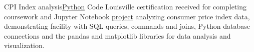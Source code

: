 \datedsubsection{}
{CPI Index analysis}{\href{https://github.com/JacobArchambault?tab=repositories&q=&type=&language=python&sort=}{Python}}
{Code Louisville certification received for completing coursework and Jupyter Notebook \href{https://github.com/jacobarchambault/cpi-python}{project} analyzing consumer price index data, demonstrating facility with SQL queries, commands and joins, 
	Python database connections and the pandas and matplotlib libraries for data analysis and visualization.}
